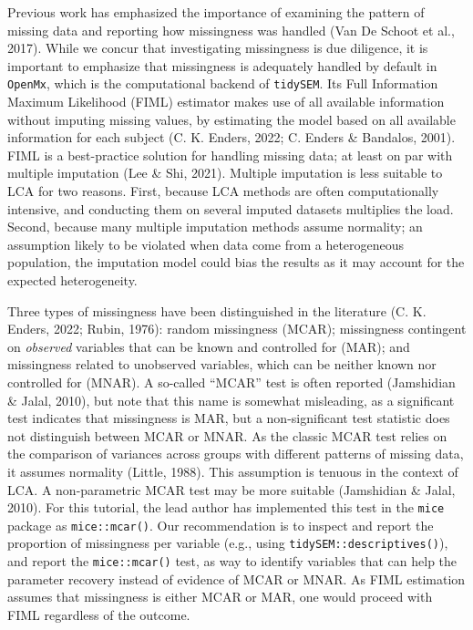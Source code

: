 \documentclass[
  ,man,floatsintext]{apa6}
\begin{document}
Previous work has emphasized the importance of examining the pattern of
missing data and reporting how missingness was handled
(Van De Schoot et al., 2017).
While we concur that investigating missingness is due diligence,
it is important to emphasize that missingness is adequately handled by default in \texttt{OpenMx}, which is the computational backend of \texttt{tidySEM}.
Its Full Information Maximum Likelihood (FIML) estimator makes use of all available
information without imputing missing values, by estimating the model based on all
available information for each subject (C. K. Enders, 2022; C. Enders \& Bandalos, 2001).
FIML is a best-practice solution for handling missing data;
at least on par with multiple imputation (Lee \& Shi, 2021).
Multiple imputation is less suitable to LCA for two reasons. First,
because LCA methods are often computationally intensive,
and conducting them on several imputed datasets multiplies the load.
Second, because many multiple imputation methods assume normality; an assumption likely to be violated when data come from a heterogeneous population, the imputation model could bias the results as it may account for the expected heterogeneity.

Three types of missingness have
been distinguished in the literature (C. K. Enders, 2022; Rubin, 1976): random missingness (MCAR);
missingness contingent on \emph{observed} variables that can be known and controlled for (MAR);
and missingness related to unobserved variables,
which can be neither known nor controlled for (MNAR).
A so-called ``MCAR'' test is often reported (Jamshidian \& Jalal, 2010),
but note that this name is somewhat misleading,
as a significant test indicates that missingness is MAR,
but a non-significant test statistic does not distinguish between MCAR or MNAR.
As the classic MCAR test relies on the comparison of variances across groups with different patterns of missing data, it assumes normality (Little, 1988).
This assumption is tenuous in the context of LCA.
A non-parametric MCAR test may be more suitable (Jamshidian \& Jalal, 2010).
For this tutorial,
the lead author has implemented this test in the \texttt{mice} package as \texttt{mice::mcar()}.
Our recommendation is to inspect and report the proportion of missingness per variable (e.g., using \texttt{tidySEM::descriptives()}),
and report the \texttt{mice::mcar()} test, as way to identify variables that can help the parameter recovery instead of evidence of MCAR or MNAR.
As FIML estimation assumes that missingness is either MCAR or MAR,
one would proceed with FIML regardless of the outcome.
\end{document}
